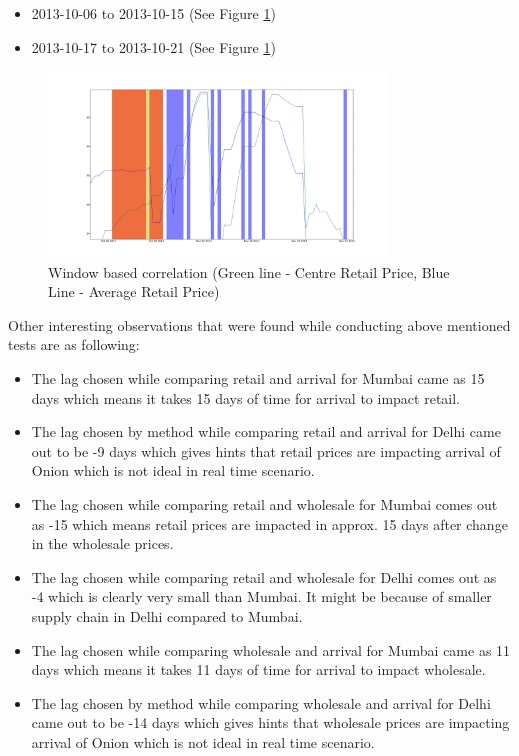 \begin{itemize}
			\begin{itemize}
				\item 2013-10-06 to 2013-10-15 (See Figure \ref{fig:20131006_1015_1021})
				\item 2013-10-17 to 2013-10-21 (See Figure \ref{fig:20131006_1015_1021})
			\end{itemize}
			\begin{figure}[H]
		    	\centering
  		    	\includegraphics[width=0.8\textwidth]{graphs/20131006_1015_1021.png}
		    	\caption{Window based correlation (Green line - Centre Retail Price, Blue Line - Average Retail Price)}
		    	\label{fig:20131006_1015_1021}
			\end{figure}
						
		\end{itemize}
		
		Other interesting observations that were found while conducting above mentioned tests are as following:
		\begin{itemize}
			\item The lag chosen while comparing retail and arrival for Mumbai came as 15 days which means it takes 15 days of time for arrival to impact retail.
			\item The lag chosen by method while comparing retail and arrival for Delhi came out to be -9 days which gives hints that retail prices are impacting arrival of Onion which is not ideal in real time scenario.
			\item The lag chosen while comparing retail and wholesale for Mumbai comes out as -15 which means retail prices are impacted in approx. 15 days after change in the wholesale prices.
			\item The lag chosen while comparing retail and wholesale for Delhi comes out as -4 which is clearly very small than Mumbai. It might be because of smaller supply chain in Delhi compared to Mumbai.
			\item The lag chosen while comparing wholesale and arrival for Mumbai came as 11 days which means it takes 11 days of time for arrival to impact wholesale.
			\item The lag chosen by method while comparing wholesale and arrival for Delhi came out to be -14 days which gives hints that wholesale prices are impacting arrival of Onion which is not ideal in real time scenario.
		\end{itemize}
		
